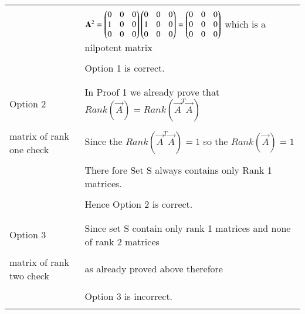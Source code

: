 \begin{longtable}{|l|l|}
    &\\
    &$\mathbf{A}^2=\begin{pmatrix}0&0&0\\1&0&0\\0&0&0\end{pmatrix}\begin{pmatrix}0&0&0\\1&0&0\\0&0&0\end{pmatrix}=\begin{pmatrix}0&0&0\\0&0&0\\0&0&0\end{pmatrix}$ which is a nilpotent matrix\\
    &\\
    &Option 1 is correct.\\
    &\\
    \hline
	\multirow{3}{*}{Option 2}
	& \\
    &In Proof 1 we already prove that $Rank(\vec{A})=Rank(\vec{A}^T\vec{A})$\\
    &\\
    matrix of rank one check &Since the $Rank(\vec{A}^T\vec{A})=1$ so the $Rank(\vec{A})=1$ \\ 
	&\\
	&There fore Set S always contains only Rank 1 matrices.\\
	&\\
	&Hence Option 2 is correct.\\
	&\\
	\hline
	\multirow{3}{*}{Option 3}
	&\\
    &Since set S contain only rank 1 matrices and none of rank 2 matrices \\
    &\\
    matrix of rank two check&as already proved above therefore\\
    &\\
    &Option 3 is incorrect.\\
    &\\
    

\end{longtable}
